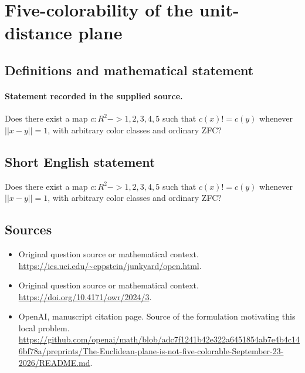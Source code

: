 \documentclass[11pt]{article}
\begin{document}
\section*{Five-colorability of the unit-distance plane}\label{statement}
\subsection{Definitions and mathematical statement}
\paragraph{Statement recorded in the supplied source.}
Does there exist a map $c:R^2->{1,2,3,4,5}$ such that $c(x)!=c(y)$ whenever $||x-y||=1$, with arbitrary color classes and ordinary ZFC?
\subsection{Short English statement}
Does there exist a map $c:R^2->{1,2,3,4,5}$ such that $c(x)!=c(y)$ whenever $||x-y||=1$, with arbitrary color classes and ordinary ZFC?
\subsection{Sources}
\begin{itemize}
\item[S1] Original question source or mathematical context.
\url{https://ics.uci.edu/~eppstein/junkyard/open.html}.
\item[S2] Original question source or mathematical context.
\url{https://doi.org/10.4171/owr/2024/3}.
\item[S3] OpenAI, manuscript citation page. Source of the formulation motivating this local problem.
\url{https://github.com/openai/math/blob/adc7f1241b42e322a6451854ab7e4b4c146bf78a/preprints/The-Euclidean-plane-is-not-five-colorable-September-23-2026/README.md}.
\end{itemize}
\end{document}
